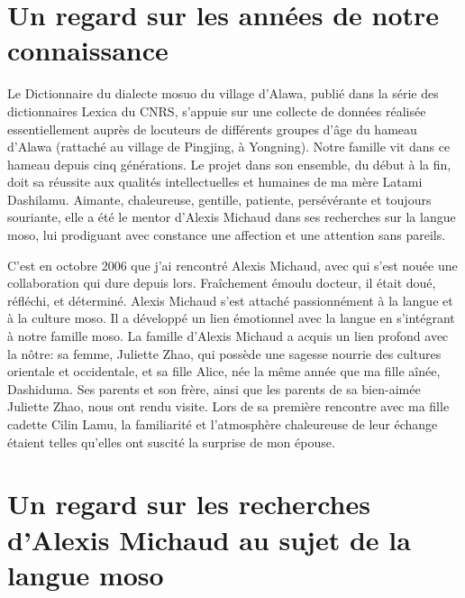 \section*{Un regard sur les années de notre connaissance}

Le Dictionnaire du dialecte mosuo du village d'Alawa, publié dans la série des dictionnaires Lexica du CNRS, s'appuie sur une collecte de données réalisée essentiellement auprès de locuteurs de différents groupes d'âge du hameau d'Alawa (rattaché au village de Pingjing, à Yongning). Notre famille vit dans ce hameau depuis cinq générations. Le projet dans son ensemble, du début à la fin, doit sa réussite aux qualités intellectuelles et humaines de ma mère Latami Dashilamu. Aimante, chaleureuse, gentille, patiente, persévérante et toujours souriante, elle a été le mentor d’Alexis Michaud dans ses recherches sur la langue moso, lui prodiguant avec constance une affection et une attention sans pareils.

C'est en octobre 2006 que j'ai rencontré Alexis Michaud, avec qui s’est nouée une collaboration qui dure depuis lors. Fraîchement émoulu docteur, il était doué, réfléchi, et déterminé. Alexis Michaud s’est attaché passionnément à la langue et à la culture moso. Il a développé un lien émotionnel avec la langue en s'intégrant à notre famille moso. La famille d’Alexis Michaud a acquis un lien profond avec la nôtre: sa femme, Juliette Zhao, qui possède une sagesse nourrie des cultures orientale et occidentale, et sa fille Alice, née la même année que ma fille aînée, Dashiduma. Ses parents et son frère, ainsi que les parents de sa bien-aimée Juliette Zhao, nous ont rendu visite. Lors de sa première rencontre avec ma fille cadette Cilin Lamu, la familiarité et l'atmosphère chaleureuse de leur échange étaient telles qu'elles ont suscité la surprise de mon épouse.

\section*{Un regard sur les recherches d’Alexis Michaud au sujet de la langue moso}

